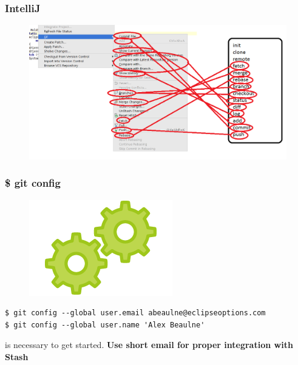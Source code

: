 \documentclass{beamer}
\begin{document}
\begin{frame}
    \frametitle{IntelliJ}
    \begin{figure}[h!]
        \begin{center}
            \includegraphics[scale=0.4]{intellij2.png}
        \end{center}
    \end{figure}
\end{frame}

\begin{frame}[fragile]
    \frametitle{\$ git config}
    \begin{figure}[h!]
        \begin{center}
            \includegraphics[scale=0.7]{config.png}
        \end{center}
    \end{figure}
    \begin{verbatim}
$ git config --global user.email abeaulne@eclipseoptions.com
$ git config --global user.name 'Alex Beaulne'
    \end{verbatim}
    is necessary to get started. \textbf{Use short email for proper integration with Stash}
\end{frame}
\end{document}
